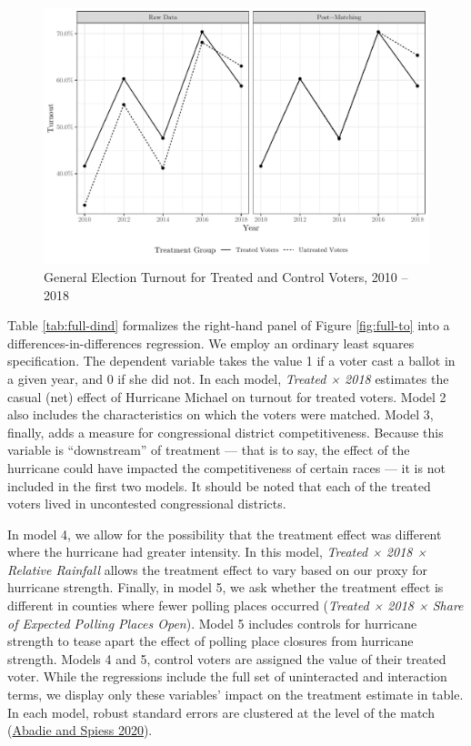 \documentclass[
  12pt,
]{article}
\begin{document}
\begin{figure}[h]

{\centering \includegraphics{hurricane_michael_files/figure-latex/full-to-chunk-1} 

}

\caption{\label{fig:full-to}General Election Turnout for Treated and Control Voters, 2010 -- 2018}\label{fig:full-to-chunk}
\end{figure}

Table \ref{tab:full-dind} formalizes the right-hand panel of Figure \ref{fig:full-to} into a differences-in-differences regression. We employ an ordinary least squares specification. The dependent variable takes the value 1 if a voter cast a ballot in a given year, and 0 if she did not. In each model, \emph{Treated × 2018} estimates the casual (net) effect of Hurricane Michael on turnout for treated voters. Model 2 also includes the characteristics on which the voters were matched. Model 3, finally, adds a measure for congressional district competitiveness. Because this variable is ``downstream'' of treatment --- that is to say, the effect of the hurricane could have impacted the competitiveness of certain races --- it is not included in the first two models. It should be noted that each of the treated voters lived in uncontested congressional districts.

In model 4, we allow for the possibility that the treatment effect was different where the hurricane had greater intensity. In this model, \emph{Treated × 2018 × Relative Rainfall} allows the treatment effect to vary based on our proxy for hurricane strength. Finally, in model 5, we ask whether the treatment effect is different in counties where fewer polling places occurred (\emph{Treated × 2018 × Share of Expected Polling Places Open}). Model 5 includes controls for hurricane strength to tease apart the effect of polling place closures from hurricane strength. Models 4 and 5, control voters are assigned the value of their treated voter. While the regressions include the full set of uninteracted and interaction terms, we display only these variables' impact on the treatment estimate in table. In each model, robust standard errors are clustered at the level of the match (\protect\hyperlink{ref-Abadie2020}{Abadie and Spiess 2020}).
\end{document}
